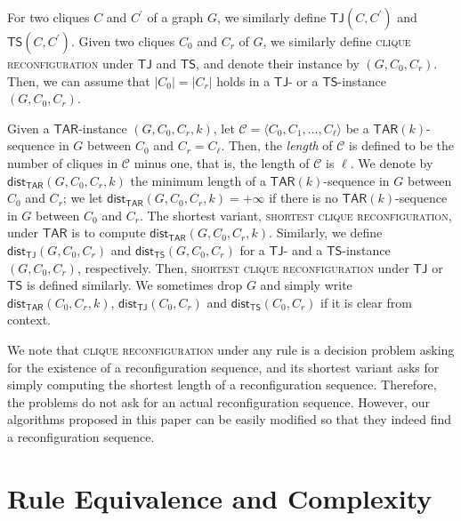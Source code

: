 \documentclass{llncs}
\newcommand{\TAR}[1]{\mathsf{TAR}(#1)}
\newcommand{\TS}{\mathsf{TS}}
\newcommand{\TJ}{\mathsf{TJ}}
\newcommand{\ini}{0}
\newcommand{\tar}{r}
\newcommand{\cliq}{C}
\newcommand{\TARrule}{\mathsf{TAR}}
\newcommand{\TSins}[2]{\mathsf{TS}(#1,#2)}
\newcommand{\TJins}[2]{\mathsf{TJ}(#1,#2)}
\newcommand{\distTAR}[3]{\mathsf{dist_{TAR}}(#1,#2,#3)}
\newcommand{\distTJ}[2]{\mathsf{dist_{TJ}}(#1,#2)}
\newcommand{\distTS}[2]{\mathsf{dist_{TS}}(#1,#2)}
\newcommand{\distTARG}[4]{\mathsf{dist_{TAR}}(#1,#2,#3,#4)}
\newcommand{\distTJG}[3]{\mathsf{dist_{TJ}}(#1,#2,#3)}
\newcommand{\distTSG}[3]{\mathsf{dist_{TS}}(#1,#2,#3)}
\newcounter{one}
\newcounter{two}
\begin{document}
	For two cliques $\cliq$ and $\cliq^\prime$ of a graph $G$, we similarly define $\TJins{\cliq}{\cliq^\prime}$ and $\TSins{\cliq}{\cliq^\prime}$.
	Given two cliques $\cliq_{\ini}$ and $\cliq_{\tar}$ of $G$, we similarly define \textsc{clique reconfiguration} under $\TJ$ and $\TS$, and denote their instance by $(G, \cliq_{\ini}, \cliq_{\tar})$.
	Then, we can assume that $|\cliq_{\ini}| = |\cliq_{\tar}|$ holds in a $\TJ$- or a $\TS$-instance $(G, \cliq_{\ini}, \cliq_{\tar})$.

	Given a $\TARrule$-instance $(G, \cliq_{\ini}, \cliq_{\tar}, k)$, let $\mathcal{C} = \langle \cliq_{\ini}, \cliq_1, \ldots, \cliq_{\ell} \rangle$ be a $\TAR{k}$-sequence in $G$ between $\cliq_{\ini}$ and $\cliq_{\tar} = \cliq_{\ell}$. 
	Then, the \emph{length} of $\mathcal{C}$ is defined to be the number of cliques in $\mathcal{C}$ minus one, that is, the length of $\mathcal{C}$ is $\ell$.
	We denote by $\distTARG{G}{\cliq_{\ini}}{\cliq_{\tar}}{k}$ the minimum length of a $\TAR{k}$-sequence in $G$ between $\cliq_{\ini}$ and $\cliq_{\tar}$;
we let $\distTARG{G}{\cliq_{\ini}}{\cliq_{\tar}}{k} = +\infty$ if there is no $\TAR{k}$-sequence in $G$ between $\cliq_{\ini}$ and $\cliq_{\tar}$. 
	The shortest variant, \textsc{shortest clique reconfiguration}, under $\TARrule$ is to compute $\distTARG{G}{\cliq_{\ini}}{\cliq_{\tar}}{k}$. 
	Similarly, we define $\distTJG{G}{\cliq_{\ini}}{\cliq_{\tar}}$ and $\distTSG{G}{\cliq_{\ini}}{\cliq_{\tar}}$ for a $\TJ$- and a $\TS$-instance $(G, \cliq_{\ini}, \cliq_{\tar})$, respectively. 
	Then, \textsc{shortest clique reconfiguration} under $\TJ$ or $\TS$ is defined similarly. 
	We sometimes drop $G$ and simply write $\distTAR{\cliq_{\ini}}{\cliq_{\tar}}{k}$, $\distTJ{\cliq_{\ini}}{\cliq_{\tar}}$ and $\distTS{\cliq_{\ini}}{\cliq_{\tar}}$ if it is clear from context.
	
	We note that \textsc{clique reconfiguration} under any rule is a decision problem asking for the existence of a reconfiguration sequence, and its shortest variant asks for simply computing the shortest length of a reconfiguration sequence. 
	Therefore, the problems do not ask for an actual reconfiguration sequence. 
	However, our algorithms proposed in this paper can be easily modified so that they indeed find a reconfiguration sequence.  


\section{Rule Equivalence and Complexity}
\label{sec:rules}
\end{document}

